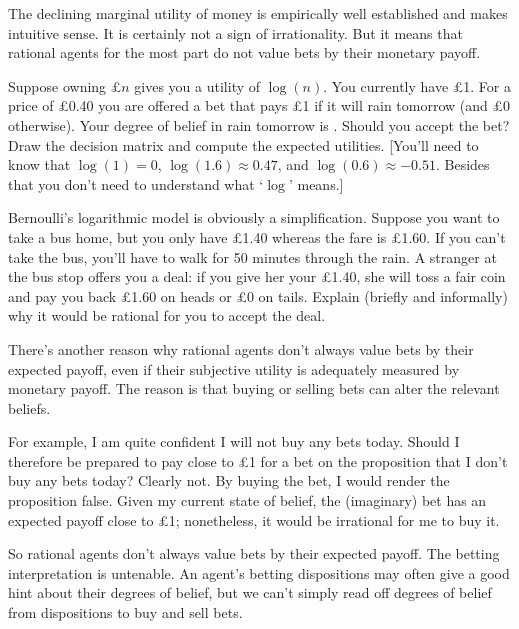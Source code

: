 The declining marginal utility of money is empirically well
established and makes intuitive sense. It is certainly not a sign of
irrationality. But it means that rational agents for the most part do
not value bets by their monetary payoff. 

\begin{exercise}
  Suppose owning £$n$ gives you a utility of $\log(n)$. You currently
  have £1. For a price of £0.40 you are offered a bet that pays £1 if
  it will rain tomorrow (and £0 otherwise). Your degree of belief in
  rain tomorrow is . Should you accept the bet?  Draw
  the decision matrix and compute the expected utilities. [You'll need
  to know that $\log(1) = 0$, $\log(1.6) \approx 0.47$, and $\log(0.6)
  \approx -0.51$. Besides that you don't need to understand what `$\log$'
  means.]
\end{exercise}

\begin{exercise}
  Bernoulli's logarithmic model is obviously a simplification. Suppose
  you want to take a bus home, but you only have £1.40 whereas the
  fare is £1.60. If you can't take the bus, you'll have to walk for 50
  minutes through the rain. A stranger at the bus stop offers you a
  deal: if you give her your £1.40, she will toss a fair coin and pay
  you back £1.60 on heads or £0 on tails. Explain (briefly and
  informally) why it would be rational for you to accept the deal.
\end{exercise}

There's another reason why rational agents don't always value bets by
their expected payoff, even if their subjective utility is adequately
measured by monetary payoff. The reason is that buying or selling bets
can alter the relevant beliefs. 

For example, I am quite confident I will not buy any bets
today. Should I therefore be prepared to pay close to £1 for a bet on
the proposition that I don't buy any bets today? Clearly not. By
buying the bet, I would render the proposition false. Given my current
state of belief, the (imaginary) bet has an expected payoff close to
£1; nonetheless, it would be irrational for me to buy it.

So rational agents don't always value bets by their expected
payoff. The betting interpretation is untenable. An agent's betting
dispositions may often give a good hint about their degrees of belief,
but we can't simply read off degrees of belief from dispositions to
buy and sell bets.

